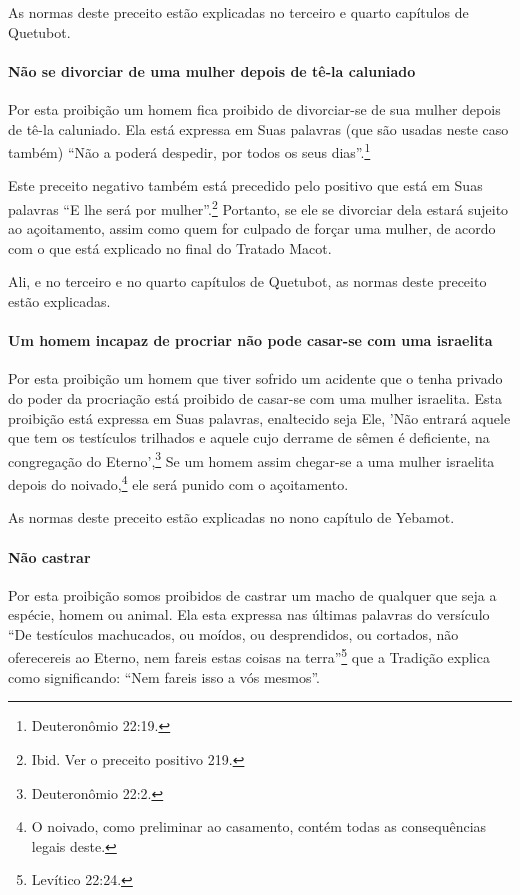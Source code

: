 As normas deste preceito estão explicadas no terceiro e quarto capítulos de Quetubot.

\paragraph{Não se divorciar de uma mulher depois de tê-la caluniado}

Por esta proibição um homem fica proibido de divorciar-se de sua mulher
depois de tê-la caluniado. Ela está expressa em Suas palavras (que são
usadas neste caso também) ``Não a poderá despedir, por todos os seus
dias''.\footnote{Deuteronômio 22:19.}

Este preceito negativo também está precedido pelo positivo que está em
Suas palavras ``E lhe será por mulher''.\footnote{Ibid. Ver o preceito positivo 219.}
Portanto, se ele se divorciar dela estará sujeito ao açoitamento, assim
como quem for culpado de forçar uma mulher, de acordo com o que está
explicado no final do Tratado Macot.

Ali, e no terceiro e no quarto capítulos de Quetubot, as normas deste
preceito estão explicadas.

\paragraph{Um homem incapaz de procriar não pode casar-se com uma israelita}

Por esta proibição um homem que tiver sofrido um acidente que o tenha
privado do poder da procriação está proibido de casar-se com uma mulher
israelita. Esta proibição está expressa em Suas palavras, enaltecido
seja Ele, 'Não entrará aquele que tem os testículos trilhados e aquele
cujo derrame de sêmen é deficiente, na congregação do Eterno',\footnote{Deuteronômio 22:2.} Se um homem assim chegar-se a uma mulher israelita
depois do noivado,\footnote{O noivado, como preliminar ao casamento, contém todas as
consequências legais deste.} ele será punido com o
açoitamento.

As normas deste preceito estão explicadas no nono capítulo de Yebamot.

\paragraph{Não castrar}

Por esta proibição somos proibidos de castrar um macho de qualquer que
seja a espécie, homem ou animal. Ela esta expressa nas últimas palavras
do versículo ``De testículos machucados, ou moídos, ou desprendidos, ou
cortados, não oferecereis ao Eterno, nem fareis estas coisas na terra''\footnote{Levítico 22:24.} que a Tradição explica como significando: ``Nem fareis
isso a vós mesmos''.


